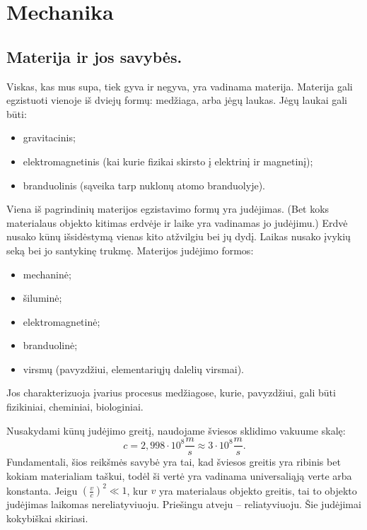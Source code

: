 \chapter{Mechanika}

\section{Materija ir jos savybės.}

Viskas, kas mus supa, tiek gyva ir negyva, yra vadinama materija.
Materija gali egzistuoti vienoje iš dviejų formų: medžiaga, arba
jėgų laukas. Jėgų laukai gali būti:
\begin{itemize}
  \item gravitacinis;
  \item elektromagnetinis (kai kurie fizikai skirsto į elektrinį
    ir magnetinį);
  \item branduolinis (sąveika tarp nuklonų atomo branduolyje).
\end{itemize}

Viena iš pagrindinių materijos egzistavimo formų yra judėjimas.
(Bet koks materialaus objekto kitimas erdvėje ir laike yra vadinamas
jo judėjimu.) Erdvė nusako kūnų išsidėstymą vienas kito atžvilgiu
bei jų dydį. Laikas nusako įvykių seką bei jo santykinę trukmę.
Materijos judėjimo formos:
\begin{itemize}
  \item mechaninė;
  \item šiluminė;
  \item elektromagnetinė;
  \item branduolinė;
  \item virsmų (pavyzdžiui, elementariųjų dalelių virsmai).
\end{itemize}
Jos charakterizuoja įvarius procesus medžiagose, kurie, pavyzdžiui,
gali būti fizikiniai, cheminiai, biologiniai.

Nusakydami kūnų judėjimo greitį, naudojame šviesos sklidimo vakuume
skalę:
\begin{equation}
  c = 2,998 \cdot 10^{8} \frac{m}{s} \approx 3 \cdot 10^{8} \frac{m}{s}.
  \label{const:c}
\end{equation}
Fundamentali, šios reikšmės savybė yra tai, kad šviesos greitis yra
ribinis bet kokiam materialiam taškui, todėl ši vertė yra vadinama
universaliąją verte arba konstanta. Jeigu
$\left( \frac{v}{c} \right)^{2} \ll 1$, kur $v$ yra materialaus objekto
greitis, tai to objekto judėjimas laikomas nereliatyviuoju.
Priešingu atveju – reliatyviuoju. Šie judėjimai kokybiškai skiriasi.

